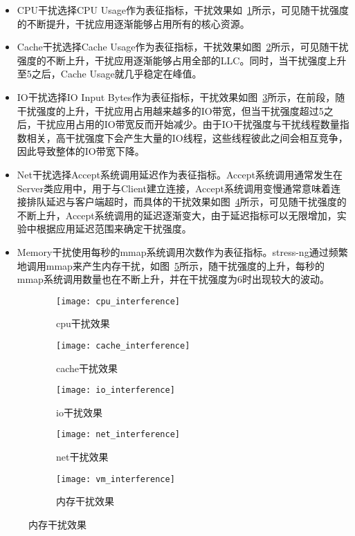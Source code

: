 \begin{itemize}
    \item CPU干扰选择CPU Usage作为表征指标，干扰效果如~\ref{fig:cpu_interference}所示，可见随干扰强度的不断提升，干扰应用逐渐能够占用所有的核心资源。
    \item Cache干扰选择Cache Usage作为表征指标，干扰效果如图~\ref{fig:cache_interference}所示，可见随干扰强度的不断上升，干扰应用逐渐能够占用全部的LLC。同时，当干扰强度上升至5之后，Cache Usage就几乎稳定在峰值。
    \item IO干扰选择IO Input Bytes作为表征指标，干扰效果如图~\ref{fig:io_interference}所示，在前段，随干扰强度的上升，干扰应用占用越来越多的IO带宽，但当干扰强度超过5之后，干扰应用占用的IO带宽反而开始减少。由于IO干扰强度与干扰线程数量指数相关，高干扰强度下会产生大量的IO线程，这些线程彼此之间会相互竞争，因此导致整体的IO带宽下降。
    \item Net干扰选择Accept系统调用延迟作为表征指标。Accept系统调用通常发生在Server类应用中，用于与Client建立连接，Accept系统调用变慢通常意味着连接排队延迟与客户端超时，而具体的干扰效果如图~\ref{fig:net_interference}所示，可见随干扰强度的不断上升，Accept系统调用的延迟逐渐变大，由于延迟指标可以无限增加，实验中根据应用延迟范围来确定干扰强度。
    \item Memory干扰使用每秒的mmap系统调用次数作为表征指标。stress-ng通过频繁地调用mmap来产生内存干扰，如图~\ref{fig:vm_interference}所示，随干扰强度的上升，每秒的mmap系统调用数量也在不断上升，并在干扰强度为6时出现较大的波动。
\end{itemize}

\begin{figure}[H]
  \centering
  \begin{subfigure}[b]{0.45\textwidth}
    \texttt{[image: cpu\_interference]}
    \caption{cpu干扰效果}
    \label{fig:cpu_interference}
  \end{subfigure}
  \begin{subfigure}[b]{0.45\textwidth}
    \texttt{[image: cache\_interference]}
    \caption{cache干扰效果}
    \label{fig:cache_interference}
  \end{subfigure}
  \begin{subfigure}[b]{0.45\textwidth}
    \texttt{[image: io\_interference]}
    \caption{io干扰效果}
    \label{fig:io_interference}
  \end{subfigure}
  \begin{subfigure}[b]{0.45\textwidth}
    \texttt{[image: net\_interference]}
    \caption{net干扰效果}
    \label{fig:net_interference}
  \end{subfigure}
  \begin{subfigure}[b]{0.45\textwidth}
    \texttt{[image: vm\_interference]}
    \caption{内存干扰效果}
    \label{fig:vm_interference}
  \end{subfigure}
  \label{fig:interference}
\end{figure}

